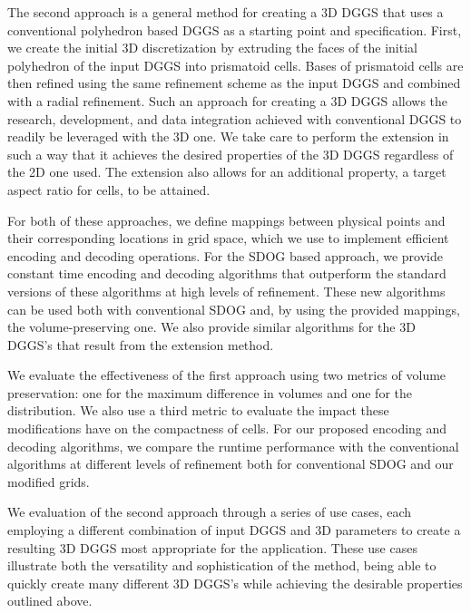 The second approach is a general method for creating a 3D DGGS that uses a conventional polyhedron based DGGS as a starting point and specification.
First, we create the initial 3D discretization by extruding the faces of the initial polyhedron of the input DGGS into prismatoid cells.
Bases of prismatoid cells are then refined using the same refinement scheme as the input DGGS and combined with a radial refinement.
Such an approach for creating a 3D DGGS allows the research, development, and data integration achieved with conventional DGGS to readily be leveraged with the 3D one.
We take care to perform the extension in such a way that it achieves the desired properties of the 3D DGGS regardless of the 2D one used.
The extension also allows for an additional property, a target aspect ratio for cells, to be attained.


For both of these approaches, we define mappings between physical points and their corresponding locations in grid space, which we use to implement efficient encoding and decoding operations.
For the SDOG based approach, we provide constant time encoding and decoding algorithms that outperform the standard versions of these algorithms at high levels of refinement.
These new algorithms can be used both with conventional SDOG and, by using the provided mappings, the volume-preserving one.
We also provide similar algorithms for the 3D DGGS's that result from the extension method.


We evaluate the effectiveness of the first approach using two metrics of volume preservation: one for the maximum difference in volumes and one for the distribution.
We also use a third metric to evaluate the impact these modifications have on the compactness of cells.
For our proposed encoding and decoding algorithms, we compare the runtime performance with the conventional algorithms at different levels of refinement both for conventional SDOG and our modified grids.


We evaluation of the second approach through a series of use cases, each employing a different combination of input DGGS and 3D parameters to create a resulting 3D DGGS most appropriate for the application.
These use cases illustrate both the versatility and sophistication of the method, being able to quickly create many different 3D DGGS's while achieving the desirable properties outlined above.


